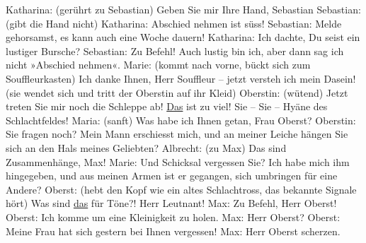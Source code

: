\begin{ledgroupsized}[t]{13cm}
           \pstart
           Katharina: (gerührt zu Sebastian) Geben Sie mir Ihre Hand, Sebastian\pend
           \pstart
           Sebastian: (gibt die Hand nicht)\pend
           \pstart
           Katharina: Abschied nehmen ist süss!\pend
           \pstart
           Sebastian: Melde gehorsamst, es kann auch eine Woche dauern!\pend
           \pstart
           Katharina: Ich dachte, Du seist ein lustiger Bursche?\pend
           \pstart
           Sebastian: Zu Befehl! Auch lustig bin ich, aber dann sag ich nicht »Abschied
					nehmen«.\pend
           \pstart
           Marie: (kommt nach vorne, bückt sich zum Souffleurkasten) Ich danke Ihnen, Herr
					Souffleur – jetzt versteh ich mein Dasein! (sie wendet sich und tritt der
					Oberstin auf ihr Kleid)\pend
           \pstart
           Oberstin: (wütend) Jetzt treten Sie mir noch die Schleppe ab! \uline{Das} ist zu viel! Sie – Sie – Hyäne des
					Schlachtfeldes!\pend
           \pstart
           Maria: (sanft) Was habe ich Ihnen getan, Frau Oberst?\pend
           \pstart
           Oberstin: Sie fragen noch? Mein Mann erschiesst mich, und an meiner Leiche hängen
					Sie sich an den Hals meines Geliebten?\pend
           \pstart
           Albrecht: (zu Max) Das sind  Zusammenhänge,
					Max!\pend
           \pstart
           Marie: Und  Schicksal vergessen Sie? Ich habe mich
					ihm hingegeben, und aus meinen Armen ist er gegangen, sich umbringen für eine
					Andere? \label{K_L01900-1v}\label{K_L01900-1h}\pend
           \pstart
           Oberst: (hebt den Kopf wie ein altes Schlachtross, das bekannte Signale hört) Was
					sind \uline{das} für Töne?! Herr Leutnant!\pend
           \pstart
           Max: Zu Befehl, Herr Oberst!\pend
           \pstart
           Oberst: Ich komme um eine Kleinigkeit zu holen.\pend
           \pstart
           Max: Herr Oberst?\pend
           \pstart
           {\pb}Oberst: Meine Frau hat sich
					gestern bei Ihnen vergessen!\pend
           \pstart
           Max: Herr Oberst scherzen.\pend
           \pstart

\end{ledgroupsized}
